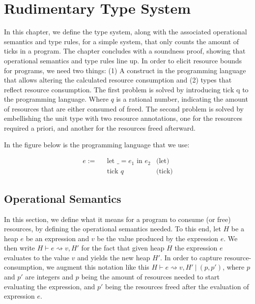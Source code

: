 \chapter{Rudimentary Type System}

In this chapter, we define the type system, along with the associated operational semantics and type rules, for a simple system, that only counts the amount of ticks in a program. The chapter concludes with a soundness proof, showing that operational semantics and type rules line up.
In order to elicit resource bounds for programs, we need two things: (1) A construct in the programming language that allows altering the calculated resource consumption and (2) types that reflect resource consumption. The first problem is solved by introducing \(\text{tick q}\) to the programming language. Where \(q\) is a rational number, indicating the amount of resources that are either consumed of freed. The second problem is solved by embellishing the unit type with two resource annotations, one for the resources required a priori, and another for the resources freed afterward.

In the figure below is the programming language that we use:

\begin{align*}
   e := ~~~ & \text{let } \_ = e_1 \text{ in } e_2   & \text{(let)}\\
            & \text{tick } q                       & \text{(tick)}
\end{align*}


\section{Operational Semantics}
In this section, we define what it means for a program to consume (or free) resources, by defining the operational semantics needed. To this end, let \(H\) be a heap \(e\) be an expression and \(v\) be the value produced by the expression \(e\). We then write \(H \vdash e \rightsquigarrow v, H'\) for the fact that given heap \(H\) the expression \(e\) evaluates to the value \(v\) and yields the new heap \(H'\). In order to capture resource-consumption, we augment this notation like this \(H \vdash e \rightsquigarrow v, H'~| ~(p, p')\), where \(p\) and \(p'\) are integers and \(p\) being the amount of resources needed to start evaluating the expression, and \(p'\) being the resources freed after the evaluation of expression \(e\).


